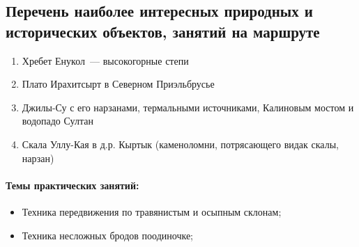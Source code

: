 \subsection{Перечень наиболее интересных природных и исторических объектов, занятий на маршруте}
\begin{enumerate}[noitemsep,topsep=0pt,parsep=0pt,partopsep=0pt]
	\item Хребет Енукол~--- высокогорные степи
	\item Плато Ирахитсырт в Северном Приэльбрусье
	\item Джилы-Су с его нарзанами, термальными источниками, Калиновым мостом и водопадо Султан
	\item Скала Уллу-Кая в д.р. Кыртык (каменоломни, потрясающего видак скалы, нарзан)
\end{enumerate}

\paragraph{Темы практических занятий:}

\begin{itemize}
	\item Техника передвижения по травянистым и осыпным склонам;
	\item Техника несложных бродов поодиночке;
\end{itemize}

\newpage
